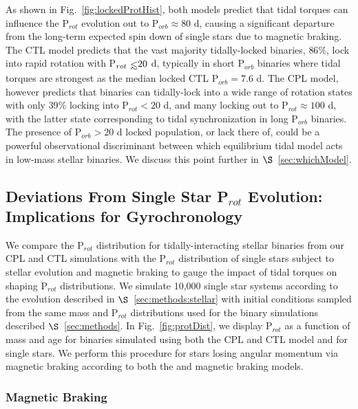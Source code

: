 \documentclass[twocolumn]{aastex61}
\def\lsim{~\rlap{$<$}{\lower 1.0ex\hbox{$\sim$}}}
\begin{document}
As shown in Fig.~\ref{fig:lockedProtHist}, both models predict that tidal torques can influence the P$_{rot}$ evolution out to P$_{orb} \approx 80$ d, causing a significant departure from the long-term expected spin down of single stars due to magnetic braking.  The CTL model predicts that the vast majority tidally-locked binaries, $86\%$, lock into rapid rotation with P$_{rot} \lsim 20$ d, typically in short P$_{orb}$ binaries where tidal torques are strongest as the median locked CTL P$_{orb} = 7.6$ d. The CPL model, however predicts that binaries can tidally-lock into a wide range of rotation states with only $39\%$ locking into P$_{rot} < 20$ d, and many locking out to P$_{rot} \approx 100$ d, with the latter state corresponding to tidal synchronization in long P$_{orb}$ binaries.  The presence of P$_{orb} > 20$ d locked population, or lack there of, could be a powerful observational discriminant between which equilibrium tidal model acts in low-mass stellar binaries.  We discuss this point further in $\S$~\ref{sec:whichModel}.

\subsection{Deviations From Single Star P$_{rot}$ Evolution: Implications for Gyrochronology} \label{sec:gyro}

We compare the P$_{rot}$ distribution for tidally-interacting stellar binaries from our CPL and CTL simulations with the P$_{rot}$ distribution of single stars subject to stellar evolution and magnetic braking to gauge the impact of tidal torques on shaping P$_{rot}$ distributions.  We simulate 10,000 single star systems according to the evolution described in $\S$~\ref{sec:methods:stellar} with initial conditions sampled from the same mass and P$_{rot}$ distributions used for the binary simulations described $\S$~\ref{sec:methods}. In Fig.~\ref{fig:protDist}, we display P$_{rot}$ as a function of mass and age for binaries simulated using both the CPL and CTL model and for single stars. We perform this procedure for stars losing angular momentum via magnetic braking according to both the \citet{Matt2015} and \citet{Reiners2012} magnetic braking models.

\subsubsection{\citet{Matt2015} Magnetic Braking}

\end{document}

